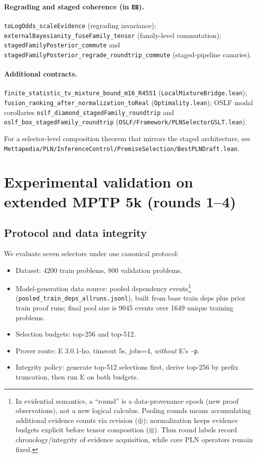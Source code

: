 \documentclass[11pt]{article}
\newcommand{\lpath}[1]{\texttt{\nolinkurl{#1}}}
\newcommand{\lid}[1]{{\ttfamily\nolinkurl{#1}}}
\begin{document}
\paragraph{Regrading and staged coherence (in \texttt{EB}).}
\lid{toLogOdds_scaleEvidence} (regrading invariance);
\lid{externalBayesianity_fuseFamily_tensor} (family-level commutation);
\lid{stagedFamilyPosterior_commute} and
\lid{stagedFamilyPosterior_regrade_roundtrip_commute} (staged-pipeline canaries).

\paragraph{Additional contracts.}
\lid{finite_statistic_tv_mixture_bound_m16_R4551}
(\lpath{LocalMixtureBridge.lean});
\lid{fusion_ranking_after_normalization_toReal}
(\lpath{Optimality.lean});
OSLF modal corollaries \lid{oslf_diamond_stagedFamily_roundtrip} and
\lid{oslf_box_stagedFamily_roundtrip}
(\lpath{OSLF/Framework/PLNSelectorGSLT.lean}).

\noindent
For a selector-level composition theorem that mirrors the staged architecture, see
\lpath{Mettapedia/PLN/InferenceControl/PremiseSelection/BestPLNDraft.lean}.

\section{Experimental validation on extended MPTP 5k (rounds 1--4)}
\subsection{Protocol and data integrity}
We evaluate seven selectors under one canonical protocol:
\begin{itemize}
\item Dataset: 4200 train problems, 800 validation problems.
\item Model-generation data source: pooled dependency events\footnote{In
      evidential semantics, a ``round'' is a data-provenance epoch (new proof
      observations), not a new logical calculus. Pooling rounds means accumulating
      additional evidence counts via revision (\(\oplus\)); normalization keeps
      evidence budgets explicit before tensor composition (\(\otimes\)).
      Thus round labels record chronology/integrity of evidence acquisition, while
      core PLN operators remain fixed.}
      (\lpath{pooled_train_deps_allruns.jsonl}), built from base train deps
      plus prior train proof runs; final pool size is 9045 events over 1649 unique
      training problems.
\item Selection budgets: top-256 and top-512.
\item Prover route: E 3.0.1-ho, timeout 5s, jobs=4, \emph{without} E's \texttt{-p}.
\item Integrity policy: generate top-512 selections first, derive top-256 by prefix
      truncation, then run E on both budgets.
\end{itemize}
\end{document}
